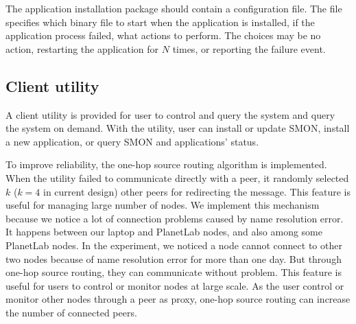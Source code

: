 
The application installation package should contain a
configuration file. The file specifies which binary file to
start when the application is installed, if the application
process failed, what actions to perform. The choices may be
no action, restarting the application for $N$ times, or
reporting the failure event.

\subsection{Client utility}

A client utility is provided for user to control and query
the system and query the system on demand. With the utility,
user can install or update SMON, install a new application,
or query SMON and applications' status.


To improve reliability, the one-hop source
routing\cite{Gummadi2004} algorithm is implemented. When the
utility failed to communicate directly with a peer, it
randomly selected $k$ ($k=4$ in current design) other peers
for redirecting the message.  This feature is useful for
managing large number of nodes. We implement this mechanism
because we notice a lot of connection problems caused by
name resolution error. It happens between our laptop and
PlanetLab nodes, and also among some PlanetLab nodes.  In
the experiment, we noticed a node cannot connect to other
two nodes because of name resolution error for more than one
day.  But through one-hop source routing, they can
communicate without problem. This feature is useful for
users to control or monitor nodes at large scale. As the
user control or monitor other nodes through a peer as proxy,
one-hop source routing can increase the number of connected
peers.

